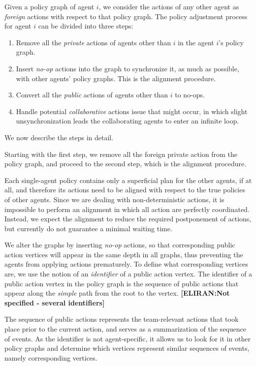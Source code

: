 \documentclass[letterpaper]{article} %
\newcommand{\eliran}[1]{\textbf{[\color{red}ELIRAN:#1]}}
\begin{document}
Given a policy graph of agent $i$, we consider the actions of any other agent as \emph{foreign} actions with respect to that policy graph. The policy adjustment process for agent $i$ can be divided into three steps:
\begin{enumerate}
    \item Remove all the \emph{private} actions of agents other than $i$ in the agent $i$'s policy graph.
    \item Insert \emph{no-op} actions into the graph to synchronize it, as much as possible, with other agents' policy graphs. This is the alignment procedure.
    \item Convert all the \emph{public} actions of  agents other than $i$ to no-ops.
    \item Handle potential \emph{collaborative} actions issue that might occur, in which slight unsynchronization leads the collaborating agents to enter an infinite loop.
\end{enumerate}
We now describe the steps in detail.

Starting with the first step, we remove all the foreign private action from the policy graph, and proceed to the second step, which is the alignment procedure.

Each single-agent policy contains only a superficial plan for the other agents, if at all, and therefore its actions need to be aligned with respect to the true policies of other agents. 
Since we are dealing with non-deterministic actions, it is impossible to perform an alignment in which all action are perfectly coordinated.
Instead, we expect the alignment to reduce the required postponement of actions, but currently do not guarantee a minimal waiting time.

We alter the graphs by inserting \emph{no-op} actions, so that corresponding public action vertices will appear in the same depth in all graphs, thus preventing the agents from applying actions prematurely.
To define what corresponding vertices are, we use the notion of an \emph{identifier} of a public action vertex. The identifier of a public action vertex in the policy graph is the
sequence of public actions that appear along the \emph{simple} path from the root to the vertex.
\eliran{Not specified - several identifiers}

The sequence of public actions represents the team-relevant actions that took place prior to the current action, and serves as a summarization of the sequence of events. As the identifier is not agent-specific, it allows us to look for it in other policy graphs and determine which vertices represent similar
sequences of events, namely corresponding vertices.
\end{document}
